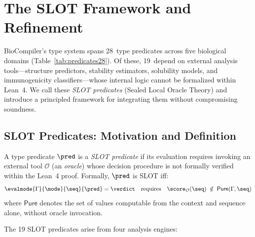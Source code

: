 \section{The SLOT Framework and Refinement}\label{sec:slot}

BioCompiler's type system spans 28~type predicates across five
biological domains (Table~\ref{tab:predicates28}).
Of these, 19~depend on external analysis tools---structure predictors,
stability estimators, solubility models, and immunogenicity
classifiers---whose internal logic cannot be formalized within Lean~4.
We call these \emph{SLOT predicates} (Sealed Local Oracle Theory) and
introduce a principled framework for integrating them without
compromising soundness.

\subsection{SLOT Predicates: Motivation and Definition}\label{sec:slot-def}

\begin{definition}
A type predicate $\pred$ is a \emph{SLOT predicate} if its evaluation
requires invoking an external tool $\mathcal{O}$ (an \emph{oracle})
whose decision procedure is not formally verified within the Lean~4
proof. Formally, $\pred$ is SLOT iff:
\[
  \evalmode{\Gamma}{\mode}{\seq}{\pred} = \verdict
  \quad\text{requires}\quad
  \score_{\mathcal{O}}(\seq) \;\notin\; \mathsf{Pure}(\Gamma, \seq)
\]
where $\mathsf{Pure}$ denotes the set of values computable from the
context and sequence alone, without oracle invocation.
\end{definition}

The 19 SLOT predicates arise from four analysis engines:

